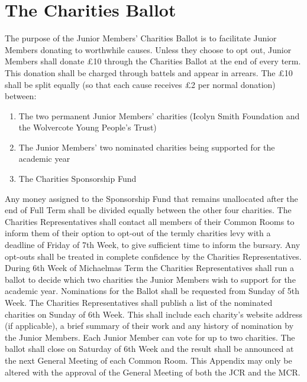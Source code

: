\chapter{The Charities Ballot}

\appnpara The purpose of the Junior Members’ Charities Ballot is to facilitate Junior Members donating to worthwhile causes.
\appnpara Unless they choose to opt out, Junior Members shall donate £10 through the Charities Ballot at the end of every term.  This donation shall be charged through battels and appear in arrears.
\appnpara The £10 shall be split equally (so that each cause receives £2 per normal donation) between:
\begin{enumerate}
\item The two permanent Junior Members' charities (Icolyn Smith Foundation and the Wolvercote Young People's Trust)
\item The Junior Members' two nominated charities being supported for the academic year
\item The Charities Sponsorship Fund
\end{enumerate}
\appnpara Any money assigned to the Sponsorship Fund that remains unallocated after the end of Full Term shall be divided equally between the other four charities.
\appnpara The Charities Representatives shall contact all members of their Common Rooms to inform them of their option to opt-out of the termly charities levy with a deadline of Friday of 7th Week, to give sufficient time to inform the bursary. Any opt-outs shall be treated in complete confidence by the Charities Representatives.
\appnpara During 6th Week of Michaelmas Term the Charities Representatives shall run a ballot to decide which two charities the Junior Members wish to support for the academic year. Nominations for the Ballot shall be requested from Sunday of 5th Week. The Charities Representatives shall publish a list of the nominated charities on Sunday of 6th Week. This shall include each charity’s website address (if applicable), a brief summary of their work and any history of nomination by the Junior Members. Each Junior Member can vote for up to two charities. The ballot shall close on Saturday of 6th Week and the result shall be announced at the next General Meeting of each Common Room.
\appnpara This Appendix may only be altered with the approval of the General Meeting of both the JCR and the MCR.
